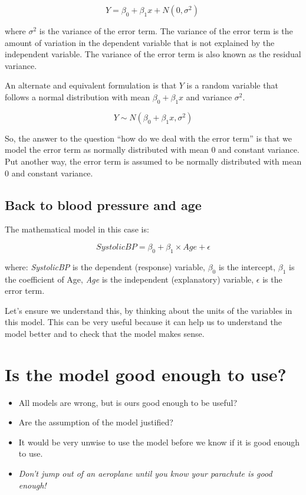 \documentclass[
  letterpaper,
  8pt,
  a4paper]{book}
\providecommand{\tightlist}{%
  \setlength{\itemsep}{0pt}\setlength{\parskip}{0pt}}
\begin{document}
\[Y = \beta_0 + \beta_1 x + N(0,\sigma^2) \ \]

where \(\sigma^2\) is the variance of the error term. The variance of
the error term is the amount of variation in the dependent variable that
is not explained by the independent variable. The variance of the error
term is also known as the residual variance.

An alternate and equivalent formulation is that \(Y\) is a random
variable that follows a normal distribution with mean
\(\beta_0 + \beta_1 x\) and variance \(\sigma^2\).

\[Y \sim N(\beta_0 + \beta_1 x, \sigma^2)\]

So, the answer to the question ``how do we deal with the error term'' is
that we model the error term as normally distributed with mean 0 and
constant variance. Put another way, the error term is assumed to be
normally distributed with mean 0 and constant variance.

\subsection*{Back to blood pressure and
age}\label{back-to-blood-pressure-and-age}

The mathematical model in this case is:

\[SystolicBP = \beta_0 + \beta_1 \times Age + \epsilon\]

where: \emph{SystolicBP} is the dependent (response) variable,
\(\beta_0\) is the intercept, \(\beta_1\) is the coefficient of Age,
\emph{Age} is the independent (explanatory) variable, \(\epsilon\) is
the error term.

Let's ensure we understand this, by thinking about the units of the
variables in this model. This can be very useful because it can help us
to understand the model better and to check that the model makes sense.

\section*{Is the model good enough to
use?}\label{is-the-model-good-enough-to-use}


\begin{itemize}
\tightlist
\item
  All models are wrong, but is ours good enough to be useful?
\item
  Are the assumption of the model justified?
\item
  It would be very unwise to use the model before we know if it is good
  enough to use.
\item
  \emph{Don't jump out of an aeroplane until you know your parachute is
  good enough!}
\end{itemize}
\end{document}

